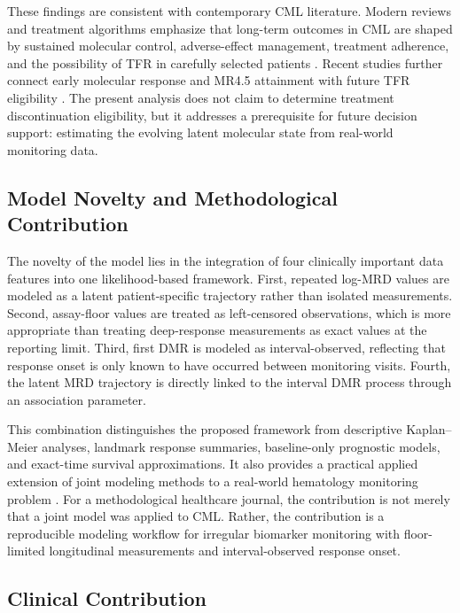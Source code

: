 \documentclass[11pt]{article}
\begin{document}
These findings are consistent with contemporary CML literature. Modern reviews and treatment algorithms emphasize that long-term outcomes in CML are shaped by sustained molecular control, adverse-effect management, treatment adherence, and the possibility of TFR in carefully selected patients \cite{Jabbour2025JAMAReview,Haddad2026Algorithms,Oehler2026TKIManagement}. Recent studies further connect early molecular response and MR4.5 attainment with future TFR eligibility \cite{Rasekh2026TFRPredictor,Ono2026MR45}. The present analysis does not claim to determine treatment discontinuation eligibility, but it addresses a prerequisite for future decision support: estimating the evolving latent molecular state from real-world monitoring data.

\subsection{Model Novelty and Methodological Contribution}

The novelty of the model lies in the integration of four clinically important data features into one likelihood-based framework. First, repeated log-MRD values are modeled as a latent patient-specific trajectory rather than isolated measurements. Second, assay-floor values are treated as left-censored observations, which is more appropriate than treating deep-response measurements as exact values at the reporting limit. Third, first DMR is modeled as interval-observed, reflecting that response onset is only known to have occurred between monitoring visits. Fourth, the latent MRD trajectory is directly linked to the interval DMR process through an association parameter.

This combination distinguishes the proposed framework from descriptive Kaplan--Meier analyses, landmark response summaries, baseline-only prognostic models, and exact-time survival approximations. It also provides a practical applied extension of joint modeling methods to a real-world hematology monitoring problem \cite{Wulfsohn1997JointModel,Rizopoulos2016JMbayes,Lovblom2026MixedObservationJointModel}. For a methodological healthcare journal, the contribution is not merely that a joint model was applied to CML. Rather, the contribution is a reproducible modeling workflow for irregular biomarker monitoring with floor-limited longitudinal measurements and interval-observed response onset.

\subsection{Clinical Contribution}
\end{document}

